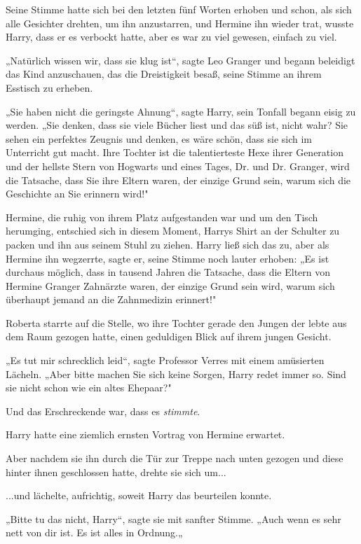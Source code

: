 {Seine Stimme hatte sich bei den letzten fünf Worten erhoben und schon, als sich alle Gesichter drehten, um ihn anzustarren, und Hermine ihn wieder trat, wusste Harry, dass er es verbockt hatte, aber es war zu viel gewesen, einfach zu viel.

„Natürlich wissen wir, dass sie klug ist“, sagte Leo Granger und begann beleidigt das Kind anzuschauen, das die Dreistigkeit besaß, seine Stimme an ihrem Esstisch zu erheben.

„Sie haben nicht die geringste Ahnung“, sagte Harry, sein Tonfall begann eisig zu werden. „Sie denken, dass sie viele Bücher liest und das süß ist, nicht wahr? Sie sehen ein perfektes Zeugnis und denken, es wäre schön, dass sie sich im Unterricht gut macht. Ihre Tochter ist die talentierteste Hexe ihrer Generation und der hellste Stern von Hogwarts und eines Tages, Dr. und Dr. Granger, wird die Tatsache, dass Sie ihre Eltern waren, der einzige Grund sein, warum sich die Geschichte an Sie erinnern wird!"

Hermine, die ruhig von ihrem Platz aufgestanden war und um den Tisch herumging, entschied sich in diesem Moment, Harrys Shirt an der Schulter zu packen und ihn aus seinem Stuhl zu ziehen. Harry ließ sich das zu, aber als Hermine ihn wegzerrte, sagte er, seine Stimme noch lauter erhoben: „Es ist durchaus möglich, dass in tausend Jahren die Tatsache, dass die Eltern von Hermine Granger Zahnärzte waren, der einzige Grund sein wird, warum sich überhaupt jemand an die Zahnmedizin erinnert!"

Roberta starrte auf die Stelle, wo ihre Tochter gerade den Jungen der lebte aus dem Raum gezogen hatte, einen geduldigen Blick auf ihrem jungen Gesicht.

„Es tut mir schrecklich leid“, sagte Professor Verres mit einem amüsierten Lächeln. „Aber bitte machen Sie sich keine Sorgen, Harry redet immer so. Sind sie nicht schon wie ein altes Ehepaar?"

Und das Erschreckende war, dass es \emph{stimmte}.

Harry hatte eine ziemlich ernsten Vortrag von Hermine erwartet.

Aber nachdem sie ihn durch die Tür zur Treppe nach unten gezogen und diese hinter ihnen geschlossen hatte, drehte sie sich um...

...und lächelte, aufrichtig, soweit Harry das beurteilen konnte.

„Bitte tu das nicht, Harry“, sagte sie mit sanfter Stimme. „Auch wenn es sehr nett von dir ist. Es ist alles in Ordnung.„

}
